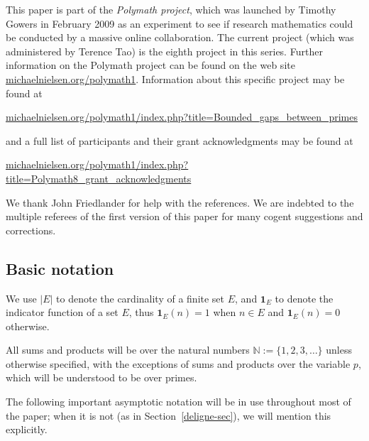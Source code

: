 \documentclass[12pt,a4paper,reqno]{amsart}
\numberwithin{equation}{section}
\theoremstyle{plain}
\theoremstyle{definition}
\newcommand\N{\mathbb{N}}
\newcommand{\onef}{\mathbf{1}}
\begin{document}
This paper is part of the \emph{Polymath project}, which was launched
by Timothy Gowers in February 2009 as an experiment to see if research
mathematics could be conducted by a massive online collaboration.
The current project (which was administered by Terence Tao) is the eighth
project in this series.  Further information on the Polymath project can be
found on the web site \url{michaelnielsen.org/polymath1}.  Information
about this specific project may be found at
\begin{center}
\small{\url{michaelnielsen.org/polymath1/index.php?title=Bounded\_gaps\_between\_primes}}
\end{center}
and a full list of participants and their grant acknowledgments may be
found at
\begin{center}
\small{\url{michaelnielsen.org/polymath1/index.php?title=Polymath8\_grant\_acknowledgments}}
\end{center}
\par
We thank John Friedlander for help with the references.  We are
indebted to the multiple referees of the first version of this paper
for many cogent suggestions and corrections.


\subsection{Basic notation}\label{notation-sec}

We use $|E|$ to denote the cardinality of a finite set $E$, and $\onef_E$ to denote the indicator function of a set $E$, thus $\onef_E(n)=1$ when $n \in E$ and $\onef_E(n)=0$ otherwise.  

All sums and products will be over the natural numbers $\N := \{1,2,3,\ldots\}$ unless otherwise specified, with the exceptions of sums and products over the variable $p$, which will be understood to be over primes.

The following important asymptotic notation will be in use throughout
most of the paper; when it is not (as in
Section~\ref{deligne-sec}), we will mention this explicitly.
\end{document}
